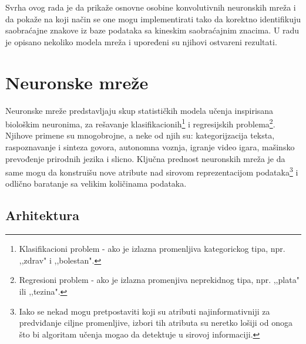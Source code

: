 \documentclass[a4paper]{article}
\begin{document}
Svrha ovog rada je da prikaže osnovne osobine konvolutivnih neuronskih mreža i da pokaže na koji način se one mogu implementirati tako da korektno identifikuju saobraćajne znakove iz baze podataka sa kineskim saobraćajnim znacima. U radu je opisano nekoliko modela mreža i upoređeni su njihovi ostvareni rezultati.

\newpage

\section{Neuronske mreže}
\label{sec:cnn}

Neuronske mreže predstavljaju skup statističkih modela učenja inspirisana biološkim neuronima, za rešavanje klasifikacionih\footnote{Klasifikacioni problem - ako je izlazna promenljiva kategorickog tipa, npr. ,,zdrav" i ,,bolestan".} i regresijskih problema\footnote{Regresioni problem - ako je izlazna promenjiva neprekidnog tipa, npr. ,,plata" ili ,,tezina".}. Njihove primene su mnogobrojne, a neke od njih su: kategorijzacija teksta,
 raspoznavanje i sinteza govora, autonomna voznja, igranje video igara, mašinsko prevođenje prirodnih jezika i slicno. Ključna prednost neuronskih mreža je da same mogu da konstruišu nove atribute nad sirovom reprezentacijom podataka\footnote{Iako se nekad mogu pretpostaviti koji su atributi najinformativniji za predviđanje ciljne promenljive, izbori tih atributa su neretko lošiji od onoga što bi algoritam učenja mogao da detektuje u sirovoj informaciji.} i odlično baratanje sa velikim količinama podataka.


\subsection{Arhitektura}
\end{document}
